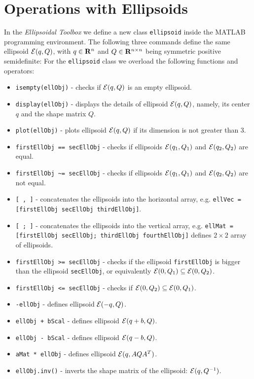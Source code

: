\section{Operations with Ellipsoids}
In the {\it Ellipsoidal Toolbox} we define a new class {\tt ellipsoid} inside
the MATLAB programming environment. The following three commands
define the same ellipsoid $\EE(q,Q)$, with $q\in{\bf R}^n$ and
$Q\in{\bf R}^{n\times n}$ being symmetric positive semidefinite:
For the {\tt ellipsoid} class we overload the following functions and operators:
\begin{itemize}
\item {\tt isempty(ellObj)} - checks if $\EE(q,Q)$ is an empty ellipsoid.
\item {\tt display(ellObj)} - displays the details of ellipsoid $\EE(q,Q)$, namely,
its center $q$ and the shape matrix $Q$.
\item {\tt plot(ellObj)} - plots ellipsoid $\EE(q,Q)$ if its dimension is not greater
than 3.
\item {\tt firstEllObj == secEllObj} - checks if ellipsoids $\EE(q_1,Q_1)$ and
$\EE(q_2,Q_2)$ are equal.
\item {\tt firstEllObj \~{ }= secEllObj} - checks if ellipsoids $\EE(q_1,Q_1)$ and
$\EE(q_2,Q_2)$ are not equal.
\item {\tt [ , ]} - concatenates the ellipsoids into the horizontal array, e.g.
{\tt ellVec = [firstEllObj secEllObj thirdEllObj]}.
\item {\tt [ ; ]} - concatenates the ellipsoids into the vertical array, e.g.
{\tt ellMat = [firstEllObj secEllObj; thirdEllObj fourthEllObj]} defines $2\times 2$ array of ellipsoids.
\item {\tt firstEllObj >= secEllObj} - checks if the ellipsoid {\tt firstEllObj} is bigger than
the ellipsoid {\tt secEllObj}, or equivalently $\EE(0,Q_1)\subseteq\EE(0,Q_2)$.
\item {\tt firstEllObj <= secEllObj} - checks if $\EE(0,Q_2)\subseteq\EE(0,Q_1)$.
\item {\tt -ellObj} - defines ellipsoid $\EE(-q,Q)$.
\item {\tt ellObj + bScal} - defines ellipsoid $\EE(q+b,Q)$.
\item {\tt ellObj - bScal} - defines ellipsoid $\EE(q-b,Q)$.
\item {\tt aMat * ellObj} - defines ellipsoid $\EE(q,AQA^T)$.
\item {\tt ellObj.inv()} - inverts the shape matrix of the ellipsoid: $\EE(q,Q^{-1})$.
\end{itemize}
